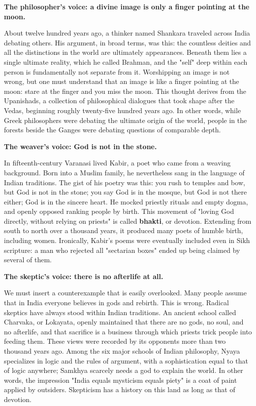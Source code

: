 \textbf{The philosopher's voice: a divine image is only a finger pointing at the moon.}

About twelve hundred years ago, a thinker named Shankara traveled across India debating others. His argument, in broad terms, was this: the countless deities and all the distinctions in the world are ultimately appearances. Beneath them lies a single ultimate reality, which he called Brahman, and the "self" deep within each person is fundamentally not separate from it. Worshipping an image is not wrong, but one must understand that an image is like a finger pointing at the moon: stare at the finger and you miss the moon. This thought derives from the Upanishads, a collection of philosophical dialogues that took shape after the Vedas, beginning roughly twenty-five hundred years ago. In other words, while Greek philosophers were debating the ultimate origin of the world, people in the forests beside the Ganges were debating questions of comparable depth.

\textbf{The weaver's voice: God is not in the stone.}

In fifteenth-century Varanasi lived Kabir, a poet who came from a weaving background. Born into a Muslim family, he nevertheless sang in the language of Indian traditions. The gist of his poetry was this: you rush to temples and bow, but God is not in the stone; you say God is in the mosque, but God is not there either; God is in the sincere heart. He mocked priestly rituals and empty dogma, and openly opposed ranking people by birth. This movement of "loving God directly, without relying on priests" is called \textbf{bhakti}, or devotion. Extending from south to north over a thousand years, it produced many poets of humble birth, including women. Ironically, Kabir's poems were eventually included even in Sikh scripture: a man who rejected all "sectarian boxes" ended up being claimed by several of them.

\textbf{The skeptic's voice: there is no afterlife at all.}

We must insert a counterexample that is easily overlooked. Many people assume that in India everyone believes in gods and rebirth. This is wrong. Radical skeptics have always stood within Indian traditions. An ancient school called Charvaka, or Lokayata, openly maintained that there are no gods, no soul, and no afterlife, and that sacrifice is a business through which priests trick people into feeding them. These views were recorded by its opponents more than two thousand years ago. Among the six major schools of Indian philosophy, Nyaya specializes in logic and the rules of argument, with a sophistication equal to that of logic anywhere; Samkhya scarcely needs a god to explain the world. In other words, the impression "India equals mysticism equals piety" is a coat of paint applied by outsiders. Skepticism has a history on this land as long as that of devotion.

